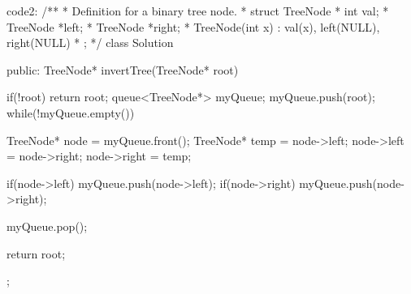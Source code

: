 code2:
/**
 * Definition for a binary tree node.
 * struct TreeNode {
 *     int val;
 *     TreeNode *left;
 *     TreeNode *right;
 *     TreeNode(int x) : val(x), left(NULL), right(NULL) {}
 * };
 */
class Solution {
public:
    TreeNode* invertTree(TreeNode* root) {
        if(!root) return root;
        queue<TreeNode*> myQueue;
        myQueue.push(root);
        while(!myQueue.empty())
        {
            TreeNode* node = myQueue.front();
            TreeNode* temp = node->left;
            node->left = node->right;
            node->right = temp;
            
            if(node->left) myQueue.push(node->left);
            if(node->right) myQueue.push(node->right);
            
            myQueue.pop();
        }
        return root;
    }
};